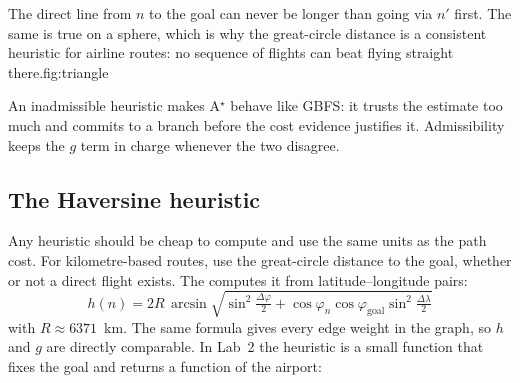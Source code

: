 \begin{utpfig}{The direct line from $n$ to the goal can never be longer than going via $n'$ first. The same is true on a sphere, which is why the great-circle distance is a consistent heuristic for airline routes: no sequence of flights can beat flying straight there.}{fig:triangle}
\end{utpfig}

\begin{intuition}
An inadmissible heuristic makes A$^\star$ behave like GBFS: it trusts the estimate too much and commits to a branch before the cost evidence justifies it. Admissibility keeps the $g$ term in charge whenever the two disagree.
\end{intuition}

\subsection{The Haversine heuristic}

Any heuristic should be cheap to compute and use the same units as the path cost. For kilometre-based routes, use the great-circle distance to the goal, whether or not a direct flight exists. The  computes it from latitude--longitude pairs:
\[
h(n)=2R\,\arcsin\!\sqrt{\sin^2\!\tfrac{\Delta\varphi}{2}+\cos\varphi_n\cos\varphi_{\text{goal}}\sin^2\!\tfrac{\Delta\lambda}{2}}
\]
with $R\approx6371$~km. The same formula gives every edge weight in the graph, so $h$ and $g$ are directly comparable. In Lab~2 the heuristic is a small function that fixes the goal and returns a function of the airport:



